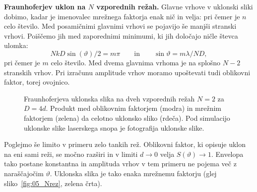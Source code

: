 \begin{example}{\bf Fraunhoferjev uklon na $N$ vzporednih režah.}
Glavne vrhove v uklonski sliki dobimo, kadar je imenovalec mrežnega faktorja enak nič in velja:
pri čemer je $n$ celo število. Med posamičnimi glavnimi vrhovi se pojavijo še manjši
stranski vrhovi. Poiščemo jih med zaporednimi minimumi, ki jih določajo ničle števca
ulomka:
\begin{equation}
NkD \sin(\vartheta)/2 = m\pi \qquad \mathrm{in} \qquad \sin \vartheta = m\lambda/ND,
\label{eq:05_29}
\end{equation}
pri čemer je $m$ celo število. Med dvema glavnima vrhoma je na splošno
$N-2$ stranskih vrhov. Pri izračunu amplitude vrhov moramo upoštevati
tudi oblikovni faktor, torej ovojnico.

\begin{figure}[ht]
\centering
\def\svgwidth{140truemm} 

\caption{Fraunhoferjeva uklonska slika na dveh vzporednih režah $N=2$ za $D=4d$. 
Produkt med oblikovnim faktorjem  (modra) in mrežnim
faktorjem (zelena) da celotno uklonsko sliko (rdeča). Pod simulacijo uklonske 
slike laserskega snopa je fotografija uklonske slike.}
\label{fig:05_2rezi}
\end{figure}

Poglejmo še limito v primeru zelo tankih rež. Oblikovni faktor, ki opisuje uklon na 
eni sami reži, se močno razširi in v limiti $d\to 0$ velja $S(\vartheta) \to 1$. Envelopa
tako postane konstantna in amplituda vrhov v tem primeru ne pojema več z naraščajočim 
$\vartheta$. Uklonska slika je tako enaka mrežnemu faktorju (glej sliko~\ref{fig:05_Nrez}, zelena črta).


\end{example}
